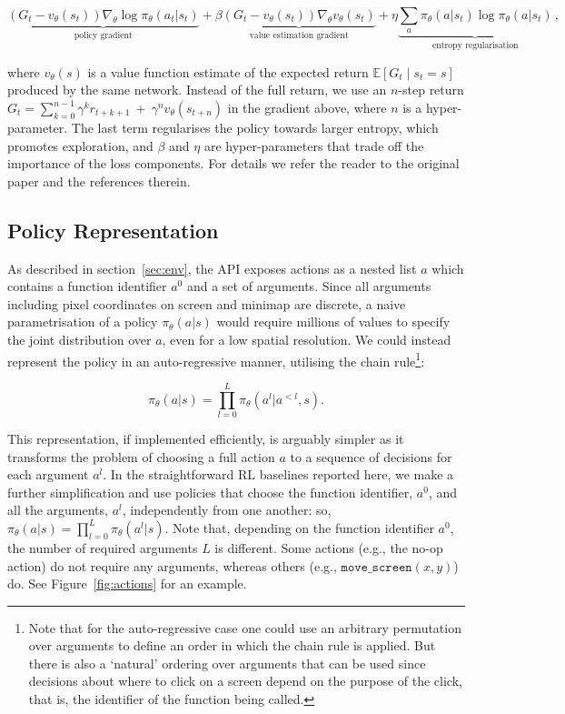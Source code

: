 \begin{equation}
\underbrace{(G_t - v_{\theta}(s_t))\nabla_{\theta}\log{\pi_{\theta}}(a_t|s_t)}_{\textrm{policy gradient}} + \beta  \underbrace{(G_t - v_{\theta}(s_t)) \nabla_{\theta} v_{\theta}(s_t)}_{\textrm{value estimation gradient}} + \eta \underbrace{\sum_a \pi_{\theta}(a|s_t) \log \pi_{\theta}(a|s_t)}_{\textrm{entropy regularisation}} \,,
\end{equation}

where $v_{\theta}(s)$ is a value function estimate of the expected return $\mathbb{E}\left[ G_t \mid s_t = s\right]$ produced by the same network.  Instead of the full return, we use an $n$-step return $G_t = \sum^{n-1}_{k=0}{\gamma^k r_{t+k+1}} ~+~ \gamma^n v_{\theta}(s_{t+n})$ in the gradient above, where $n$ is a hyper-parameter.  The last term regularises the policy towards larger entropy, which promotes exploration, and $\beta$ and $\eta$ are hyper-parameters that trade off the importance of the loss components. For details we refer the reader to the original paper \cite{mnih2016asynchronous} and the references therein.

\subsection{Policy Representation}\label{sec:policy_representation}

As described in section~\ref{sec:env}, the API exposes actions as a nested list $a$ which contains a function identifier $a^0$ and a set of arguments. Since all arguments including pixel coordinates on screen and minimap are discrete, a naive parametrisation of a policy $\pi_{\theta}(a | s)$ would require millions of values to specify the joint distribution over $a$, even for a low spatial resolution. We could instead represent the policy in an auto-regressive manner, utilising the chain rule\footnote{Note that for the auto-regressive case one could use an arbitrary permutation over arguments to define an order in which the chain rule is applied.  But there is also a `natural' ordering over arguments that can be used since decisions about where to click on a screen depend on the purpose of the click, that is, the identifier of the function being called.}:

\begin{equation}
    \pi_{\theta}(a | s) =
    \prod_{l=0}^L \pi_{\theta}(a^l | a^{<l}, s).
\end{equation}

This representation, if implemented efficiently, is arguably simpler as it transforms the problem of choosing a full action $a$ to a sequence of decisions for each argument $a^l$. In the straightforward RL baselines reported here, we make a further simplification and use policies that choose the function identifier, $a^0$, and all the arguments, $a^l$, independently from one another: so, $\pi_{\theta}(a | s) = \prod_{l=0}^L \pi_{\theta}(a^l | s)$. Note that, depending on the function identifier $a^0$, the number of required arguments $L$ is different. Some actions (e.g., the no-op action) do not require any arguments, whereas others (e.g., $\texttt{move\_screen}(x, y)$) do. See Figure~\ref{fig:actions} for an example.


